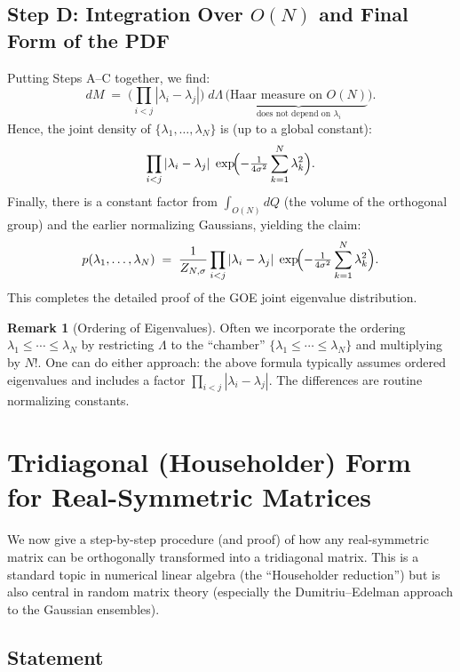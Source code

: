 \documentclass[letterpaper,11pt,oneside,reqno]{article}
\numberwithin{equation}{section}
\theoremstyle{definition}
\newtheorem{remark}[proposition]{Remark}
\begin{document}
\subsection{Step D: Integration Over \(O(N)\) and Final Form of the PDF}
\label{subsec:final-form}

Putting Steps A--C together, we find:
\[
  dM
  \;=\;
  \biggl(\prod_{i<j}|\lambda_i-\lambda_j|\biggr)\;
  d\Lambda
  \,\bigl(\underbrace{\text{Haar measure on }O(N)}_{\text{does not depend on }\lambda_i}\bigr).
\]
Hence, the joint density of \(\{\lambda_1,\dots,\lambda_N\}\) is (up to a global constant):
\[
  \prod_{i<j}|\lambda_i-\lambda_j|\;
  \exp\!\Bigl(-\tfrac{1}{4\sigma^2}\sum_{k=1}^N \lambda_k^2\Bigr).
\]
Finally, there is a constant factor from \(\int_{O(N)} dQ\) (the volume of the orthogonal group) and the earlier normalizing Gaussians, yielding the claim:
\[
  p(\lambda_1,\dots,\lambda_N)
  \;=\;
  \frac{1}{Z_{N,\sigma}}
  \prod_{i<j}|\lambda_i-\lambda_j|\;
  \exp\!\Bigl(-\tfrac{1}{4\sigma^2}\sum_{k=1}^N \lambda_k^2\Bigr).
\]
This completes the detailed proof of the GOE joint eigenvalue distribution.

\begin{remark}[Ordering of Eigenvalues]
Often we incorporate the ordering \(\lambda_1\le\cdots\le \lambda_N\) by restricting \(\Lambda\) to the “chamber” \(\{\lambda_1\le\cdots\le\lambda_N\}\) and multiplying by \(N!\).  One can do either approach: the above formula typically assumes ordered eigenvalues and includes a factor \(\prod_{i<j}|\lambda_i-\lambda_j|\).  The differences are routine normalizing constants.
\end{remark}

\section{Tridiagonal (Householder) Form for Real-Symmetric Matrices}
\label{sec:householder}

We now give a step-by-step procedure (and proof) of how any real-symmetric matrix can be orthogonally transformed into a tridiagonal matrix. This is a standard topic in numerical linear algebra (the “Householder reduction”) but is also central in random matrix theory (especially the Dumitriu–Edelman approach to the Gaussian ensembles).

\subsection{Statement}
\end{document}
